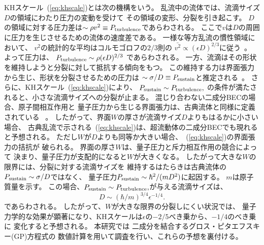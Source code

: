 \documentclass[12pt,a4paper]{jbook}
\begin{document}
        KHスケール~(\ref{eq:khscale})とは次の機構をいう。
        乱流中の流体では、流滴サイズ$D$の領域にわたり圧力の変動を受けて
        その領域の変形、分裂を引き起こす。
        $D$の領域に対する圧力差は$\sim \rho v^2 \equiv P_{\rm turbulence}$であらわされる。
        ここで$v$は$D$の周囲に圧力を生じさせるための流体の速度差である。
        一様な等方乱流の慣性領域において、
        $v^2$の統計的な平均はコルモゴロフの$2/3$則の
        $\bar{v^2} \propto (\epsilon D)^{2/3}$に従う~\cite{Frisch}。
        よって圧力は、
        $P_{\rm turbulence} \sim \rho (\epsilon D)^{2/3}$
        であらわされる。
        一方、流滴はその形状を維持しようと分裂に対して抵抗する傾向をもつ。
        この維持する力は界面張力から生じ、形状を分裂させるための圧力は
        $\sim \sigma /D \equiv P_{\rm sustain}$と推定される~\cite{Landau}。
        さらに、KHスケール~(\ref{eq:khscale})により、
            $
            P_{\rm sustain} \sim P_{\rm turbulence},
            $
        の条件が満たされると、小さな流滴サイズへの分裂が止まる。
        混じり合わない二成分BECの場合、原子間相互作用と
        量子圧力から生じる界面張力は、古典流体と同様に定義されている
        ~\cite{Ao, Barankov, Schae}。
        したがって、界面$W$の厚さが流滴サイズ$D$よりもはるかに小さい場合、
        古典乱流で示される~(\ref{eq:khscale})は、超流動体の二成分BECでも現れると予想される。
        ただし$W$が$D$よりも同等か大きい場合、~(\ref{eq:khscale})の界面張力の拮抗が
        破られる。
        界面の厚さ$W$は、量子圧力と斥力相互作用の競合によって
        決まり、量子圧力が支配的になると$W$が大きくなる。
        したがって大きな$W$の限界には、分裂に対する流滴サイズを
        維持するはたらきは古典流体の$P_{\rm sustain} \sim \sigma /D$ではなく、
        量子圧力$P_{\rm sustain} \sim \hbar^2 / (m D^2)$に起因する。
        $m$は原子質量を示す。
        この場合、$P_{\rm sustain} \sim P_{\rm turbulence},$が与える流滴サイズは、
        \begin{equation} \label{qHinze}
            D \sim (\hbar / m)^{3/4} \epsilon^{-1/4}.
        \end{equation}
        であらわされる。
        したがって、$W$が大きな限界の分裂しにくい状況では、
        量子力学的な効果が顕著になり、KHスケールは$\epsilon$の$-2/5$べき乗から、$-1/4$のべき乗に
        変化すると予想される。
        本研究では
		二成分を結合するグロス・ピタエフスキー(GP)方程式の
        数値計算を用いて調査を行い、これらの予想を裏付ける。
\end{document}
